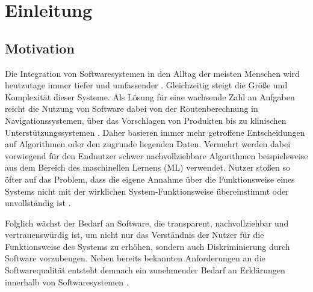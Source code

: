 \chapter{Einleitung}

\section{Motivation}

Die Integration von Softwaresystemen in den Alltag der meisten Menschen wird heutzutage immer tiefer und umfassender \cite{carvalho2020developers}.  Gleichzeitig steigt die Größe und Komplexität dieser Systeme. Als Lösung für eine wachsende Zahl an Aufgaben reicht die Nutzung von Software dabei von der Routenberechnung in Navigationssystemen, über das Vorschlagen von Produkten bis zu klinischen Unterstützungssystemen \cite{chazette2020explainability, tintarev2015explaining, cypko2017guide}. Daher basieren immer mehr getroffene Entscheidungen auf Algorithmen oder den zugrunde liegenden Daten. Vermehrt werden dabei vorwiegend für den Endnutzer schwer nachvollziehbare Algorithmen beispielsweise aus dem Bereich des maschinellen Lernens (ML) verwendet. Nutzer stoßen so öfter auf das Problem, dass die eigene Annahme über die Funktionsweise eines Systems nicht mit der wirklichen System-Funktionsweise übereinstimmt oder unvollständig ist \cite{chazette_knowledge_nodate}.

Folglich wächst der Bedarf an Software, die transparent, nachvollziehbar und vertrauenswürdig ist, um nicht nur das Verständnis der Nutzer für die Funktionsweise des Systems zu erhöhen, sondern auch Diskriminierung durch Software vorzubeugen. Neben bereits bekannten Anforderungen an die Softwarequalität \cite{international2011iso} entsteht demnach ein zunehmender Bedarf an Erklärungen innerhalb von Softwaresystemen \cite{chazette_end-users_nodate}.

